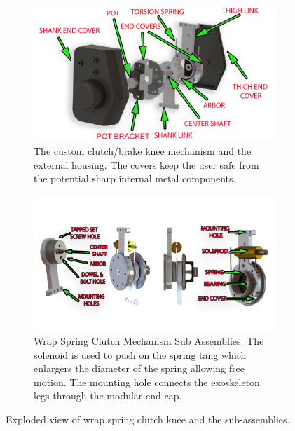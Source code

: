 \begin{figure}
    \begin{subfigure}{\textwidth}
        \centering
        \captionsetup{justification=centering}
        \centerline{
        \includegraphics[scale=0.16]{images/mech_design/knee exploded view_edit2.png}}
        \caption[Custom Knee Mechanism]{The custom clutch/brake knee mechanism and the external housing. The covers keep the user safe from the potential sharp internal metal components. }
        \label{fig:kneemechASM}
    \end{subfigure}
    \begin{subfigure}{\textwidth}
        \centering
        \captionsetup{justification=centering}
        \centerline{
        \includegraphics[scale=0.3]{images/mech_design/all_knee.png}}
        \caption[Wrap Spring Clutch Mechanism]{Wrap Spring Clutch Mechanism Sub Assemblies. The solenoid is used to push on the spring tang which enlargers the diameter of the spring  allowing free motion. The mounting hole connects the exoskeleton legs through the modular end cap. }
        \label{fig:subknee}
    \end{subfigure}    
    \caption{Exploded view of wrap spring clutch knee and the sub-assemblies.}
    \label{fig:kneemech}
\end{figure}

